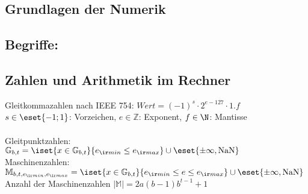 \documentclass[fs, footer]{latex4ei}
\begin{document}
\begin{sectionbox}
\begin{sectionbox}
\section{Grundlagen der Numerik}
\begin{sectionbox}
	\subsection*{Begriffe:}
\end{sectionbox}

\begin{sectionbox}
	\subsection{Zahlen und Arithmetik im Rechner}
	Gleitkommazahlen nach IEEE 754: \quad $Wert = (-1)^s \cdot 2^{e-127} \cdot 1.f$\\
	$s \in \eset{-1;1}$: Vorzeichen, $e \in \mathbb Z$: Exponent, $f \in \N$: Mantisse\\ 
	\\
	Gleitpunktzahlen: \\
	$\mathbb G_{b,t} = \iset{ x \in \mathbb G_{b,t}}{e_{\ir min} \le e_{\ir max}} \cup \eset{\pm \infty, \text{NaN}}$ \\
	
	Maschinenzahlen:\\
	$\mathbb M_{b, t, e_{\ir min}, e_{\ir max}} = \iset{x \in \mathbb G_{b,t}}{e_{\ir min} \le e \le e_{\ir max}} \cup \eset{\pm \infty, \text{NaN}}$ \\
	Anzahl der Maschinenzahlen $| \mathbb M | = 2a(b-1)b^{t-1} + 1$\\
	

\end{sectionbox}
\end{sectionbox}
\end{sectionbox}
\end{document}
